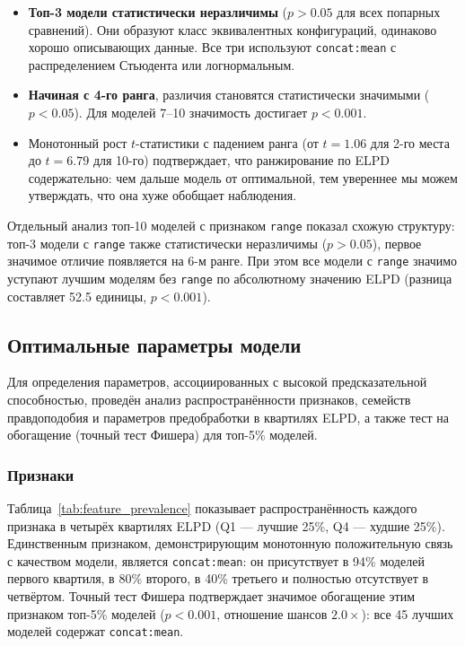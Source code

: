 \documentclass[14pt]{mmcs_article}
\begin{document}
	\begin{itemize}
		\item \textbf{Топ-3 модели статистически неразличимы}
		($p > 0.05$ для всех попарных сравнений). Они
		образуют класс эквивалентных конфигураций,
		одинаково хорошо описывающих данные. Все три
		используют \texttt{concat:mean} с распределением
		Стьюдента или логнормальным.
		
		\item \textbf{Начиная с 4-го ранга}, различия становятся
		статистически значимыми ($p < 0.05$). Для моделей
		7--10 значимость достигает $p < 0.001$.
		
		\item Монотонный рост $t$-статистики с падением ранга
		(от $t = 1.06$ для 2-го места до $t = 6.79$ для
		10-го) подтверждает, что ранжирование по ELPD
		содержательно: чем дальше модель от оптимальной,
		тем увереннее мы можем утверждать, что она хуже обобщает наблюдения.
	\end{itemize}
	
	Отдельный анализ топ-10 моделей с признаком \texttt{range}
	показал схожую структуру: топ-3 модели с \texttt{range}
	также статистически неразличимы ($p > 0.05$), первое
	значимое отличие появляется на 6-м ранге. При этом все
	модели с \texttt{range} значимо уступают лучшим моделям без
	\texttt{range} по абсолютному значению ELPD (разница
	составляет 52.5 единицы, $p < 0.001$).
	
	
	\subsection{Оптимальные параметры модели}
	
	Для определения параметров, ассоциированных с высокой
	предсказательной способностью, проведён анализ
	распространённости признаков, семейств правдоподобия и
	параметров предобработки в квартилях ELPD, а также тест на
	обогащение (точный тест Фишера) для топ-5\% моделей.
	
	\subsubsection*{Признаки}
	
	Таблица~\ref{tab:feature_prevalence} показывает
	распространённость каждого признака в четырёх квартилях ELPD
	(Q1 — лучшие 25\%, Q4 — худшие 25\%). Единственным признаком,
	демонстрирующим монотонную положительную связь с качеством
	модели, является \texttt{concat:mean}: он присутствует в 94\%
	моделей первого квартиля, в 80\% второго, в 40\% третьего и
	полностью отсутствует в четвёртом. Точный тест Фишера
	подтверждает значимое обогащение этим признаком топ-5\% моделей
	($p < 0.001$, отношение шансов $2.0\times$): все 45 лучших
	моделей содержат \texttt{concat:mean}.
	
\end{document}

